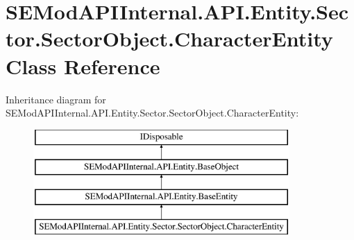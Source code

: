 \hypertarget{class_s_e_mod_a_p_i_internal_1_1_a_p_i_1_1_entity_1_1_sector_1_1_sector_object_1_1_character_entity}{}\section{S\+E\+Mod\+A\+P\+I\+Internal.\+A\+P\+I.\+Entity.\+Sector.\+Sector\+Object.\+Character\+Entity Class Reference}
\label{class_s_e_mod_a_p_i_internal_1_1_a_p_i_1_1_entity_1_1_sector_1_1_sector_object_1_1_character_entity}
Inheritance diagram for S\+E\+Mod\+A\+P\+I\+Internal.\+A\+P\+I.\+Entity.\+Sector.\+Sector\+Object.\+Character\+Entity\+:\begin{figure}[H]
\begin{center}
\leavevmode
\includegraphics[height=4.000000cm]{class_s_e_mod_a_p_i_internal_1_1_a_p_i_1_1_entity_1_1_sector_1_1_sector_object_1_1_character_entity}
\end{center}
\end{figure}
